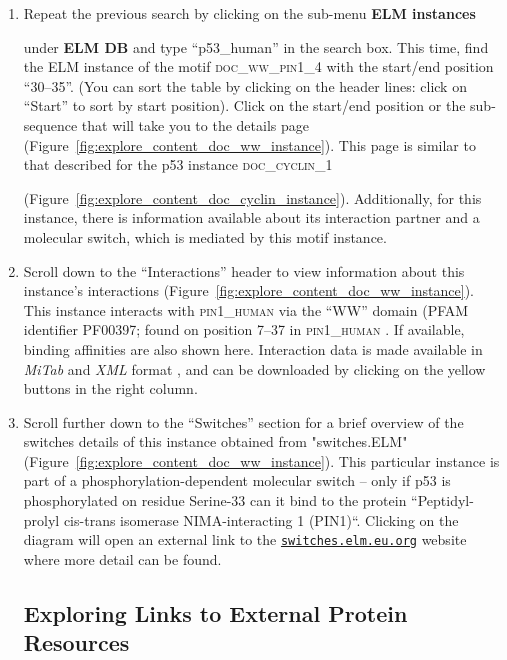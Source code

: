 \documentclass[12pt]{article}
\newcommand\rurl[1]{%
	\href{http://#1}{\nolinkurl{#1}}%
}
\newcommand\button[1]{%
	\textbf{#1}%
}
\newcommand\motif[1]{%
    \textsc{\lowercase{#1}}%
}
\newcommand\uniprot[1]{%
	\textsc{\lowercase{#1}}%
}
\newcommand\fileformat[1]{%
    \textit{#1}{}%
}%
\begin{document}
\begin{enumerate}
	\item Repeat the previous search by clicking on the sub-menu \button{ELM instances}
		under \button{ELM DB} and type ``p53\_human'' in the search box. This time,
		find the ELM instance of the motif \motif{DOC\_WW\_Pin1\_4} with the
		start/end position ``30--35''. (You can sort the table by clicking on the
		header lines: click on ``Start'' to sort by start position). Click on the
		start/end position or the sub-sequence that will take you to the details
		page (Figure~\ref{fig:explore_content_doc_ww_instance}). This
		page is similar to that described for the p53 instance \motif{DOC\_CYCLIN\_1}
		(Figure~\ref{fig:explore_content_doc_cyclin_instance}).
		Additionally, for this instance, there is information available about
		its interaction partner and a molecular switch, which is mediated by
		this motif instance.

	\item Scroll down to the ``Interactions'' header to view information about this
		instance's interactions
		(Figure~\ref{fig:explore_content_doc_ww_instance}). This instance
		interacts with \uniprot{PIN1\_Human} via the ``WW'' domain (PFAM identifier
		PF00397; found on position 7--37 in \uniprot{PIN1\_Human}. If available,
		binding affinities are also shown here. Interaction data is made
		available in \fileformat{MiTab} and \fileformat{XML} format
		\citep{17925023}, and can be downloaded by clicking on the yellow
		buttons in the right column.

	\item Scroll further down to the ``Switches'' section for a brief overview of
		the switches details of this instance obtained from "switches.ELM"
		\citep{23550212} (Figure~\ref{fig:explore_content_doc_ww_instance}). This
		particular instance is part of a phosphorylation-dependent molecular switch --
		only if p53 is phosphorylated on residue Serine-33 can it bind to the protein
		``Peptidyl-prolyl cis-trans isomerase NIMA-interacting 1 (PIN1)``.
		Clicking on the diagram will open an external link to the
		\rurl{switches.elm.eu.org} website where more detail can be found.

	\subsection*{Exploring Links to External Protein Resources}
	\label{subsec:explore_content_links_to_external_resources}


\end{enumerate}
\end{document}
